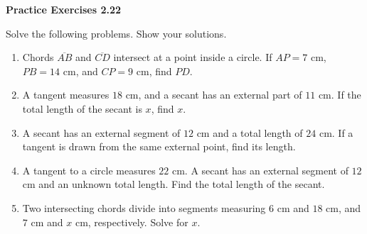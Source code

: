 \vspace{0.3ex}
\noindent\textbf{Practice Exercises 2.22}

\vspace{0.2ex}

Solve the following problems. Show your solutions.

\begin{enumerate}
    \item Chords $\overline{AB}$ and $\overline{CD}$ intersect at a point inside a circle. If $AP = 7$ cm, $PB = 14$ cm, and $CP = 9$ cm, find $PD$.
    \item A tangent measures $18$ cm, and a secant has an external part of $11$ cm. If the total length of the secant is $x$, find $x$.
    \item A secant has an external segment of $12$ cm and a total length of $24$ cm. If a tangent is drawn from the same external point, find its length.
    \item A tangent to a circle measures $22$ cm. A secant has an external segment of $12$ cm and an unknown total length. Find the total length of the secant.
    \item Two intersecting chords divide into segments measuring $6$ cm and $18$ cm, and $7$ cm and $x$ cm, respectively. Solve for $x$.
\end{enumerate}
